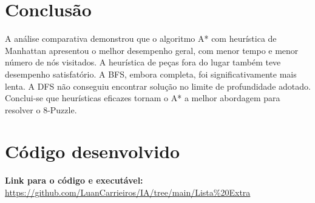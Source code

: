 \documentclass[sigconf]{acmart}
\begin{document}
\section{Conclusão}

A análise comparativa demonstrou que o algoritmo A* com heurística de Manhattan apresentou o melhor desempenho geral, com menor tempo e menor número de nós visitados. A heurística de peças fora do lugar também teve desempenho satisfatório. A BFS, embora completa, foi significativamente mais lenta. A DFS não conseguiu encontrar solução no limite de profundidade adotado. Conclui-se que heurísticas eficazes tornam o A* a melhor abordagem para resolver o 8-Puzzle.

\section{Código desenvolvido}
\textbf{Link para o código e executável:} \url{https://github.com/LuanCarrieiros/IA/tree/main/Lista%20Extra}
\end{document}
